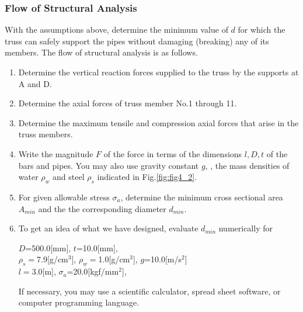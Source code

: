 \documentclass[10pt,a4j]{article}
\begin{document}
\subsubsection{Flow of Structural Analysis}
With the assumptions above, determine the minimum value of $d$ for which the 
truss can safely support the pipes without damaging (breaking) any of its members. 
The flow of structural analysis is as follows.
\begin{enumerate}
\item
	Determine the vertical reaction forces supplied to the truss by the supports at A and D. 
\item
	Determine the axial forces of truss member No.1 through 11. 
\item
	Determine the maximum tensile and compression axial forces that arise in the truss members. 
\item
	Write the magnitude $F$ of the force in terms of the dimensions 
	$l,D,t$ of the bars and pipes. You may also use gravity constant $g$, 
	, the mass densities of water $\rho_w$ and steel $\rho_s$ 
	indicated in Fig.\ref{fig:fig4_2}. 
\item
	For given allowable stress $\sigma_a$, determine the minimum cross sectional 
	area $A_{min}$ and the the corresponding diameter $d_{min}$. 
\item
	To get an idea of what we have designed, evaluate $d_{min}$ numerically for\\
		\begin{center}
			$D$=500.0[mm], $t$=10.0[mm],  \\
			$\rho_s=$7.9[g/cm$^3$],
			$\rho_w=$1.0[g/cm$^3$],
			$g$=10.0[m/s$^2$] \\
			$l=3.0$[m],
			$\sigma_a$=20.0[kgf/mm$^2$], 
		\end{center}
	If necessary, you may use a scientific calculator, spread sheet software, or computer programming language. 
\end{enumerate}
\end{document}
